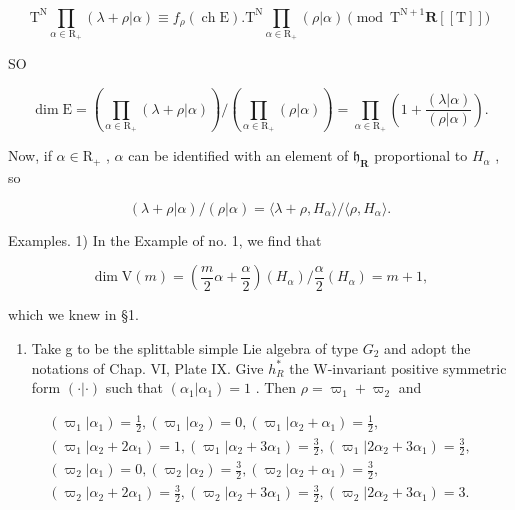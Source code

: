 \[
\mathrm{T} ^ {\mathrm{N}} \prod_ {\alpha \in \mathrm{R} _ {+}} (\lambda + \rho | \alpha) \equiv f _ {\rho} (\operatorname{ch} \mathrm{E}). \mathrm{T} ^ {\mathrm{N}} \prod_ {\alpha \in \mathrm{R} _ {+}} (\rho | \alpha) \pmod {\mathrm{T} ^ {\mathrm{N} + 1} \mathbf {R} [ [ \mathrm{T} ] ]}
\]

SO

\[
\dim \mathrm{E} = \left(\prod_ {\alpha \in \mathrm{R} _ {+}} (\lambda + \rho | \alpha)\right) / \left(\prod_ {\alpha \in \mathrm{R} _ {+}} (\rho | \alpha)\right) = \prod_ {\alpha \in \mathrm{R} _ {+}} \left(1 + \frac {(\lambda | \alpha)}{(\rho | \alpha)}\right).
\]

Now, if \(\alpha \in \mathrm{R}_{+}\) , \(\alpha\) can be identified with an element of \(\mathfrak{h}_{\mathbf{R}}\) proportional to \(H_{\alpha}\) , so

\[
(\lambda + \rho | \alpha) / (\rho | \alpha) = \langle \lambda + \rho , H _ {\alpha} \rangle / \langle \rho , H _ {\alpha} \rangle .
\]

Examples. 1) In the Example of no. 1, we find that

\[
\dim \mathrm{V} (m) = \left(\frac {m}{2} \alpha + \frac {\alpha}{2}\right) (H _ {\alpha}) / \frac {\alpha}{2} (H _ {\alpha}) = m + 1,
\]

which we knew in §1.

\begin{enumerate}
\def\labelenumi{\arabic{enumi})}
\setcounter{enumi}{1}
\tightlist
\item
  Take g to be the splittable simple Lie algebra of type \(G_{2}\) and adopt the notations of Chap. VI, Plate IX. Give \(h_{R}^{*}\) the W-invariant positive symmetric form \((\cdot|\cdot)\) such that \((\alpha_{1}|\alpha_{1})=1\) . Then \(\rho=\varpi_{1}+\varpi_{2}\) and
\end{enumerate}

\[
\begin{array}{c} (\varpi_ {1} | \alpha_ {1}) = \frac {1}{2}, (\varpi_ {1} | \alpha_ {2}) = 0, (\varpi_ {1} | \alpha_ {2} + \alpha_ {1}) = \frac {1}{2}, \\ (\varpi_ {1} | \alpha_ {2} + 2 \alpha_ {1}) = 1, (\varpi_ {1} | \alpha_ {2} + 3 \alpha_ {1}) = \frac {3}{2}, (\varpi_ {1} | 2 \alpha_ {2} + 3 \alpha_ {1}) = \frac {3}{2}, \\ (\varpi_ {2} | \alpha_ {1}) = 0, (\varpi_ {2} | \alpha_ {2}) = \frac {3}{2}, (\varpi_ {2} | \alpha_ {2} + \alpha_ {1}) = \frac {3}{2}, \\ (\varpi_ {2} | \alpha_ {2} + 2 \alpha_ {1}) = \frac {3}{2}, (\varpi_ {2} | \alpha_ {2} + 3 \alpha_ {1}) = \frac {3}{2}, (\varpi_ {2} | 2 \alpha_ {2} + 3 \alpha_ {1}) = 3. \end{array}
\]

